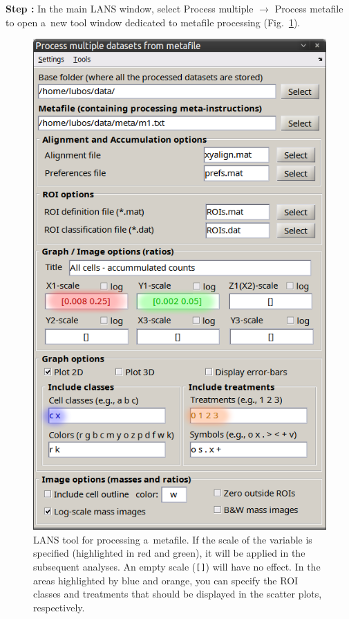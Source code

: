\documentclass[a4paper, 11pt]{article}
\newcommand{\ttt}[1]{\texttt{#1}}
\newcommand{\lans}[1]{{\color{magenta}#1}}
\newcommand\ra{\rightarrow}
\newcounter{step}
\newcommand\s{\addtocounter{step}{1}\vskip5pt\noindent\textbf{Step \thestep:}{ }}
\begin{document}
\s In the main LANS window, select \lans{Process multiple} $\ra$ \lans{Process metafile} to open a~new tool window dedicated to metafile processing (Fig.~\ref{fig:process-metafile}).

\begin{figure}[!ht]
\centering
\includegraphics[scale=0.4]{figs3/LANS-process-metafile}
\caption{\label{fig:process-metafile}%
LANS tool for processing a~metafile. If the scale of the variable is specified (highlighted in red and green), it will be applied in the subsequent analyses. An empty scale (\ttt{[]}) will have no effect. In the areas highlighted by blue and orange, you can specify the ROI classes and treatments that should be displayed in the scatter plots, respectively.}
\end{figure}
\end{document}
